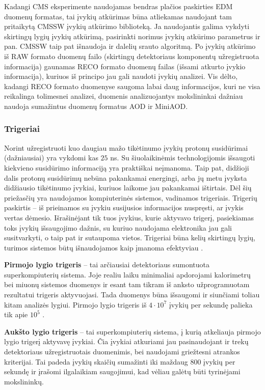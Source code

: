 \documentclass[a4paper, 12pt]{article}
\begin{document}
Kadangi CMS eksperimente naudojamas bendras plačios paskirties EDM duomenų formatas, tai įvykių atkūrimas
būna atliekamas naudojant tam pritaikytą CMSSW įvykių atkūrimo biblioteką.
Ja naudojantis galima vykdyti skirtingų lygių įvykių atkūrimą, pasirinkti norimus įvykių atkūrimo
parametrus ir pan.
CMSSW taip pat išnaudoja ir dalelių srauto algoritmą.
Po įvykių atkūrimo iš RAW formato duomenų failo (skirtingų detektoriaus komponentų užregistruota informacija)
gaunamas RECO formato duomenų failas (išsami atkurto įvykio informacija), kuriuos iš principo
jau gali naudoti įvykių analizei.
Vis dėlto, kadangi RECO formato duomenyse saugoma labai daug informacijos, kuri ne visa reikalinga tolimesnei
analizei, duomenis analizuojantys mokslininkai dažniau naudoja sumažintus duomenų formatus AOD ir MiniAOD.


\subsubsection{Trigeriai}\label{sec:trigger}

Norint užregistruoti kuo daugiau mažo tikėtinumo įvykių protonų susidūrimai (dažniausiai) yra vykdomi kas
$25$ ns.
Su šiuolaikinėmis technologijomis išsaugoti kiekvieno susidūrimo informaciją yra praktiškai neįmanoma.
Taip pat, didžioji dalis protonų susidūrimų nebūna pakankamai energingi, arba jų metu įvyksta didžiausio
tikėtinumo įvykiai, kuriuos laikome jau pakankamai ištirtais.
Dėl šių priežasčių yra naudojamos kompiuterinės sistemos, vadinamos trigeriais.
Trigerių paskirtis -- iš prieinamos su įvykiu susijusios informacijos nuspręsti, ar įvykis vertas dėmesio.
Išrašinėjant tik tuos įvykius, kurie aktyvavo trigerį, pasiekiamas toks įvykių išsaugojimo dažnis, su kuriuo
naudojama elektronika jau gali susitvarkyti, o taip pat ir sutaupoma vietos.
Trigeriai būna kelių skirtingų lygių, turimos sistemos būtų išnaudojamos kaip įmanoma efektyviau \cite{ECALtrig}.

\textbf{Pirmojo lygio trigeris} -- tai arčiausiai detektoriaus sumontuota superkompiuterių sistema.
Joje realiu laiku minimaliai apdorojami kalorimetrų bei miuonų sistemos duomenys ir esant tam tikram iš
anksto užprogramuotam rezultatui trigeris aktyvuojasi.
Tada duomenys būna išsaugomi ir siunčiami toliau kitam analizės lygiui.
Pirmojo lygio trigeris iš $4 \! \cdot \! 10^{7}$  įvykių per sekundę palieka tik apie $10^{5}$ \cite{HLtrigger}.

\textbf{Aukšto lygio trigeris} -- tai superkompiuterių sistema, į kurią atkeliauja pirmojo lygio trigerį
aktyvavę įvykiai.
Čia įvykiai atkuriami jau pasinaudojant ir trekų detektoriaus užregistruotais duomenimis, bei naudojami
griežtesni atrankos kriterijai.
Tai padeda įvykių skaičių sumažinti iki maždaug $800$ įvykių per sekundę ir įrašomi ilgalaikiam saugojimui,
kad vėliau galėtų būti tyrinėjami mokslininkų.
\end{document}
